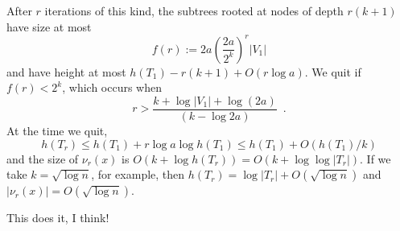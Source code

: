 \documentclass[kpfonts]{patmorin}
\begin{document}
After $r$ iterations of this kind, the subtrees rooted at nodes of depth $r(k+1)$ have size at most
\[
     f(r) := 2a\left(\frac{2a}{2^k}\right)^r|V_1|
\]
and have height at most $h(T_1)-r(k+1)+O(r\log a)$.  We quit if $f(r)<2^k$, which occurs when
\[
   r > \frac{k + \log |V_1| + \log(2a)}{(k-\log 2a)} \enspace .
\]
At the time we quit, 
\[
   h(T_r) \le h(T_1)+r\log a\log h(T_1) \le h(T_1) + O(h(T_1)/k)
\]
and the size of $\nu_r(x)$ is $O(k+\log h(T_r))=O(k+\log\log |T_r|)$.  
If we take $k=\sqrt{\log n}$, for example, then $h(T_r)=\log |T_r|+O(\sqrt{\log n})$ and $|\nu_r(x)|=O(\sqrt{\log n})$.

This does it, I think!





% 
% 
% 

\end{document}
